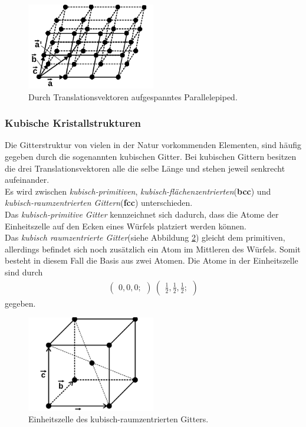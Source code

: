\begin{figure}[hhh]
\centering
\includegraphics[width=0.5\textwidth]{abbildungen/epiped.png}
\caption{Durch Translationsvektoren aufgespanntes Parallelepiped.\cite{sample}}
\label{fig:abb2}
\end{figure}

\subsubsection{Kubische Kristallstrukturen}
\label{subsubsec:kubische_gitter}

Die Gitterstruktur von vielen in der Natur vorkommenden Elementen,
sind häufig gegeben durch die sogenannten kubischen Gitter.
Bei kubischen Gittern besitzen die drei Translationsvektoren
alle die selbe Länge und stehen jeweil senkrecht aufeinander.\\
Es wird zwischen \textit{kubisch-primitiven},
\textit{kubisch-flächenzentrierten}(\textbf{bcc}) und \\
\textit{kubisch-raumzentrierten Gittern}(\textbf{fcc}) unterschieden.\\
Das \textit{kubisch-primitive Gitter}
kennzeichnet sich dadurch,
dass die Atome der Einheitszelle auf den Ecken
eines Würfels platziert werden können.\\
Das \textit{kubisch raumzentrierte Gitter}(siehe Abbildung \ref{fig:bcc})
gleicht dem primitiven, allerdings befindet sich noch
zusätzlich ein Atom im Mittleren des Würfels.
Somit besteht in diesem Fall die Basis aus zwei Atomen.
Die Atome in der Einheitszelle sind durch
\begin{align}
\label{eqn:2*}
\begin{pmatrix}
0, 0, 0;
\end{pmatrix} \
\begin{pmatrix}
\frac{1}{2}, \frac{1}{2}, \frac{1}{2};
\end{pmatrix}
\end{align}
gegeben.\\

\begin{figure}[hhh]
\centering
\includegraphics[width=0.5\textwidth]{abbildungen/bcc.png}
\caption{Einheitszelle des kubisch-raumzentrierten Gitters.\cite{sample}}
\label{fig:bcc}
\end{figure}


